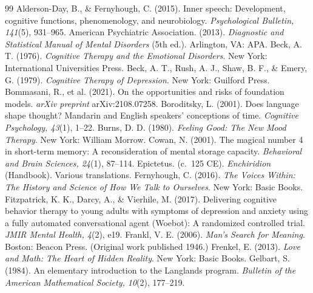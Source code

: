 \documentclass[11pt]{article}
\begin{document}
\begin{thebibliography}{99}\small
\setlength{\itemsep}{1pt}
 Alderson-Day, B., \& Fernyhough, C. (2015). Inner speech: Development, cognitive functions, phenomenology, and neurobiology. \emph{Psychological Bulletin, 141}(5), 931--965.
 American Psychiatric Association. (2013). \emph{Diagnostic and Statistical Manual of Mental Disorders} (5th ed.). Arlington, VA: APA.
 Beck, A. T. (1976). \emph{Cognitive Therapy and the Emotional Disorders}. New York: International Universities Press.
 Beck, A. T., Rush, A. J., Shaw, B. F., \& Emery, G. (1979). \emph{Cognitive Therapy of Depression}. New York: Guilford Press.
 Bommasani, R., et al. (2021). On the opportunities and risks of foundation models. \emph{arXiv preprint} arXiv:2108.07258.
 Boroditsky, L. (2001). Does language shape thought? Mandarin and English speakers' conceptions of time. \emph{Cognitive Psychology, 43}(1), 1--22.
 Burns, D. D. (1980). \emph{Feeling Good: The New Mood Therapy}. New York: William Morrow.
 Cowan, N. (2001). The magical number 4 in short-term memory: A reconsideration of mental storage capacity. \emph{Behavioral and Brain Sciences, 24}(1), 87--114.
 Epictetus. (c.~125 CE). \emph{Enchiridion} (Handbook). Various translations.
 Fernyhough, C. (2016). \emph{The Voices Within: The History and Science of How We Talk to Ourselves}. New York: Basic Books.
 Fitzpatrick, K. K., Darcy, A., \& Vierhile, M. (2017). Delivering cognitive behavior therapy to young adults with symptoms of depression and anxiety using a fully automated conversational agent (Woebot): A randomized controlled trial. \emph{JMIR Mental Health, 4}(2), e19.
 Frankl, V. E. (2006). \emph{Man's Search for Meaning}. Boston: Beacon Press. (Original work published 1946.)
 Frenkel, E. (2013). \emph{Love and Math: The Heart of Hidden Reality}. New York: Basic Books.
 Gelbart, S. (1984). An elementary introduction to the Langlands program. \emph{Bulletin of the American Mathematical Society, 10}(2), 177--219.

\end{thebibliography}
\end{document}
